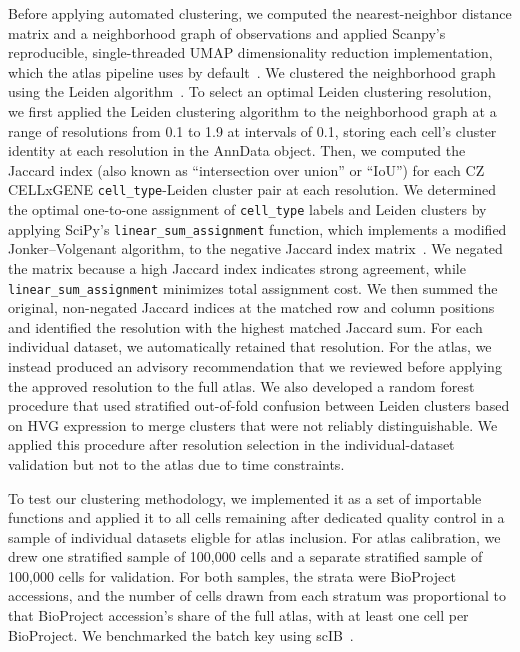 \documentclass[10pt,letterpaper]{article}
\begin{document}
Before applying automated clustering, we computed the nearest-neighbor distance matrix and a neighborhood graph of observations and applied Scanpy's reproducible, single-threaded UMAP dimensionality reduction implementation, which the atlas pipeline uses by default~\parencite{mcinnesUMAPUniformManifold2018}. We clustered the neighborhood graph using the Leiden algorithm~\parencite{traagLouvainLeidenGuaranteeing2019}. To select an optimal Leiden clustering resolution, we first applied the Leiden clustering algorithm to the neighborhood graph at a range of resolutions from 0.1 to 1.9 at intervals of 0.1, storing each cell's cluster identity at each resolution in the AnnData object. Then, we computed the Jaccard index (also known as ``intersection over union'' or ``IoU'') for each CZ CELLxGENE \texttt{cell_type}-Leiden cluster pair at each resolution. We determined the optimal one-to-one assignment of \texttt{cell_type} labels and Leiden clusters by applying SciPy's \texttt{linear\_sum\_assignment} function, which implements a modified Jonker--Volgenant algorithm, to the negative Jaccard index matrix~\parencite{crouseImplementing2DRectangular2016,virtanenSciPy10Fundamental2020}. We negated the matrix because a high Jaccard index indicates strong agreement, while \texttt{linear\_sum\_assignment} minimizes total assignment cost. We then summed the original, non-negated Jaccard indices at the matched row and column positions and identified the resolution with the highest matched Jaccard sum. For each individual dataset, we automatically retained that resolution. For the atlas, we instead produced an advisory recommendation that we reviewed before applying the approved resolution to the full atlas. We also developed a random forest procedure that used stratified out-of-fold confusion between Leiden clusters based on HVG expression to merge clusters that were not reliably distinguishable. We applied this procedure after resolution selection in the individual-dataset validation but not to the atlas due to time constraints.

To test our clustering methodology, we implemented it as a set of importable functions and applied it to all cells remaining after dedicated quality control in a sample of individual datasets eligble for atlas inclusion. For atlas calibration, we drew one stratified sample of 100,000 cells and a separate stratified sample of 100,000 cells for validation. For both samples, the strata were BioProject accessions, and the number of cells drawn from each stratum was proportional to that BioProject accession's share of the full atlas, with at least one cell per BioProject. We benchmarked the batch key using scIB~\parencite{lueckenBenchmarkingAtlaslevelData2022}.
\end{document}
